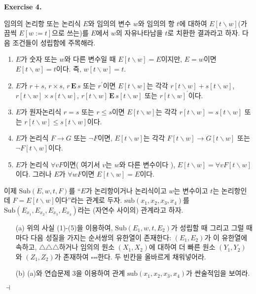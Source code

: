 \documentclass[12pt]{paper}
\newenvironment{context}[1][]
{ \noindent \textbf{{#1}.}
}
{ \hfill $ \dashv $ }
\begin{document}
\begin{context}[Exercise 4]
임의의 논리항 또는 논리식 $E$와 임의의 변수 $w$와 임의의 항 $t$에 대하여
$E \left[ t \backslash w \right]$(가끔씩 $E \left[ w := t \right]$으로 쓰는)를 $E$에서
$w$의 자유나타남을 $t$로 치환한 결과라고 하자. 다음 조건들이 성립함에 주목해라.
\begin{enumerate}
\item $E$가 숫자 또는 $w$와 다른 변수일 때 $E \left[ t \backslash w \right] = E$이지만,
$E = w$이면 $E \left[ t \backslash w \right] = t$이다. 즉, $w \left[ t \backslash w \right] = t$.
\item $E$가 $r + s$, $r \times s$, $r \, \mathbf{E} \, s$ 또는 $r^{\prime}$이면
$E \left[ t \backslash w \right]$는 각각 $r \left[ t \backslash w \right] + s \left[ t \backslash w \right]$,
$r \left[ t \backslash w \right] \times s \left[ t \backslash w \right]$, $ r \left[ t \backslash w \right] \, \mathbf{E} \, s \left[ t \backslash w \right]$ 또는 $r \left[ t \backslash w \right]^{\prime}$이다.
\item $E$가 원자논리식 $r = s$ 또는 $r \le s$이면
$E \left[ t \backslash w \right]$는 각각 $ r \left[ t \backslash w \right] = s \left[ t \backslash w \right] $ 또는 $ r \left[ t \backslash w \right] \le s \left[ t \backslash w \right] $이다.
\item $E$가 논리식 $F \rightarrow G$ 또는 $\lnot F$이면,
$E \left[ t \backslash w \right]$는 각각
$F \left[ t \backslash w \right] \rightarrow G \left[ t \backslash w \right]$ 또는
$\lnot F \left[ t \backslash w \right]$이다.
\item $E$가 논리식 $\forall v F$이면( 여기서 $v$는 $w$와 다른 변수이다 ),
$E \left[ t \backslash w \right] = \forall v F \left[ t \backslash w \right]$이다.
그러나 $E$가 $\forall w F$이면 $E \left[ t \backslash w \right] = E$이다. 
\end{enumerate}
이제 $\mathrm{Sub} \left( E , w , t , F \right)$를 ``$E$가 논리항이거나 논리식이고 $w$는 변수이고 $t$는 논리항인데 $F = E\left[ t \backslash w \right]$이다''라는 관계로 두자.
$\mathrm{sub} \left( x_1, x_2, x_3, x_4 \right)$를 $\mathrm{Sub} \left( E_{x_1} , E_{x_2} , E_{x_3} , E_{x_4} \right)$라는 (자연수 사이의) 관계라고 하자.
\begin{itemize}
\item[(a)] 위의 사실 (1)-(5)을 이용하여, $\mathrm{Sub} \left( E_1, w, t, E_2 \right)$가 성립할 때 그리고 그럴 때마다
다음 성질을 가지는 순서쌍의 유한열이 존재한다:
$\left( E_1, E_2 \right)$가 이 유한열에 속하고,
$\triangle \triangle \triangle$하거나 임의의 원소 $\left( X_1, X_2 \right)$에 대하여
더 빠른 원소 $\left( Y_1 , Y_2 \right)$와 $\left( Z_1 , Z_2 \right)$가 존재하여 $\square \square \square$한다.
두 빈칸을 올바르게 채워넣어라.
\item[(b)] (a)와 연습문제 3을 이용하여 관계 $\mathrm{sub} \left( x_1 , x_2 , x_3 , x_4 \right)$가 싼술적임을 보여라.
\end{itemize}
\end{context}
\end{document}
